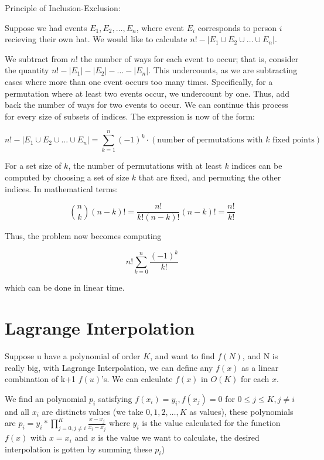         Principle of Inclusion-Exclusion:
        
        Suppose we had events $E_1, E_2, \dots, E_n$, where event $E_i$ corresponds to
        person $i$ recieving their own hat. We would like to calculate $n! - \lvert E_1 \cup E_2 \cup \dots \cup E_n \rvert$.
        
        We subtract from $n!$ the number of ways for each event to occur; that is,
        consider the quantity $n! - \lvert E_1 \rvert - \lvert E_2 \rvert - \dots - \lvert E_n \rvert$. This undercounts, as we are subtracting cases where more
        than one event occurs too many times. Specifically, for a permutation where at
        least two events occur, we undercount by one. Thus, add back the number of ways
        for two events to occur. We can continue this process for every size of subsets
        of indices. The expression is now of the form:
        
        $$n! - \lvert E_1 \cup E_2 \cup \dots \cup E_n \rvert = \sum_{k = 1}^n (-1)^k \cdot (\text{number of permutations with $k$ fixed points})$$
        
        For a set size of $k$, the number of permutations with at least $k$ indices can
        be computed by choosing a set of size $k$ that are fixed, and permuting the
        other indices. In mathematical terms:
        
        $${n \choose k}(n-k)! = \frac{n!}{k!(n-k)!}(n-k)! = \frac{n!}{k!}$$
        
        Thus, the problem now becomes computing
        
        $$n!\sum_{k=0}^n\frac{(-1)^k}{k!}$$
        
        which can be done in linear time.
    \section{Lagrange Interpolation}
        \tab Suppose u have a polynomial of order $K$, and want to find $f(N)$, and N is really big, with
        Lagrange Interpolation, we can define any $f(x)$ as a linear combination of k+1 $f(u)$'s. We can calculate 
        $f(x)$ in $O(K)$ for each $x$.

        We find an polynomial $p_i$ satisfying $f(x_i) = y_i,f(x_j) = 0$ for $0 \le j \le K, j \neq i$ and
        all $x_i$ are distincts values (we take $0,1,2,\dots,K$ as values), these polynomials are 
        $p_i = y_i * \prod_{j=0,j \neq i}^{K} \frac{x - x_j}{x_i - x_j}$ where $y_i$ is the value calculated for the function $f(x)$
        with $x = x_i$ and $x$ is the value we want to calculate, the desired interpolation is gotten by summing these $p_i$)

